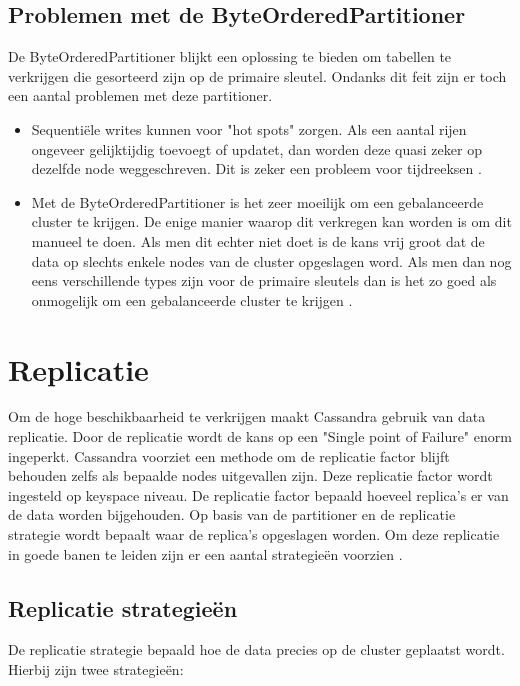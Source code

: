 \subsection{Problemen met de ByteOrderedPartitioner}
De ByteOrderedPartitioner blijkt een oplossing te bieden om tabellen te verkrijgen die gesorteerd zijn op de primaire sleutel.
Ondanks dit feit zijn er toch een aantal problemen met deze partitioner.

\begin{itemize}
	\item Sequentiële writes kunnen voor "hot spots" zorgen.
	Als een aantal rijen ongeveer gelijktijdig toevoegt of updatet, dan worden deze quasi zeker op dezelfde node weggeschreven.
	Dit is zeker een probleem voor tijdreeksen \citep{kan2014cassandra}.
	
	\item Met de ByteOrderedPartitioner is het zeer moeilijk om een gebalanceerde cluster te krijgen.
	De enige manier waarop dit verkregen kan worden is om dit manueel te doen.
	Als men dit echter niet doet is de kans vrij groot dat de data op slechts enkele nodes van de cluster opgeslagen word.
	Als men dan nog eens verschillende types zijn voor de primaire sleutels dan is het zo goed als onmogelijk om een gebalanceerde cluster te krijgen
	\citep{Bauer2013CaseAgainstByteOrder}.
\end{itemize}

\section{Replicatie}
Om de hoge beschikbaarheid te verkrijgen maakt Cassandra gebruik van data replicatie.
Door de replicatie wordt de kans op een "Single point of Failure" enorm ingeperkt.
Cassandra voorziet een methode om de replicatie factor blijft behouden zelfs als bepaalde nodes uitgevallen zijn.
Deze replicatie factor wordt ingesteld op keyspace niveau.
De replicatie factor bepaald hoeveel replica's er van de data worden bijgehouden.
Op basis van de partitioner en de replicatie strategie wordt  bepaalt waar de replica's opgeslagen worden.
Om deze replicatie in goede banen te leiden zijn er een aantal strategieën voorzien \citep{kan2014cassandra}.

\subsection{Replicatie strategieën}
De replicatie strategie bepaald hoe de data precies op de cluster geplaatst wordt.
Hierbij zijn twee strategieën:

